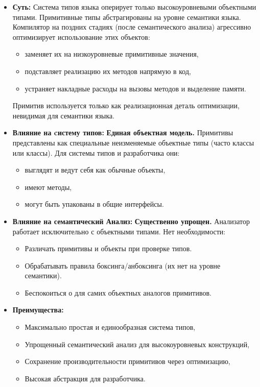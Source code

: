 \begin{itemize}[label={--}, leftmargin=*]
    \item \textbf{Суть:} Система типов языка оперирует только высокоуровневыми объектными типами. Примитивные типы абстрагированы на уровне семантики языка. Компилятор на поздних стадиях (после семантического анализа) агрессивно оптимизирует использование этих объектов:
    \begin{itemize}[label={--}]
        \item заменяет их на низкоуровневые примитивные значения,
        \item подставляет реализацию их методов напрямую в код,
        \item устраняет накладные расходы на вызовы методов и выделение памяти.
    \end{itemize}
    Примитив используется только как реализационная деталь оптимизации, невидимая для семантики языка.

    \item \textbf{Влияние на cистему типов:} \textbf{Единая объектная модель.} Примитивы представлены как специальные неизменяемые объектные типы (часто  классы или  классы). Для системы типов и разработчика они:
    \begin{itemize}[label={--}]
        \item выглядят и ведут себя как обычные объекты,
        \item имеют методы,
        \item могут быть упакованы в общие интерфейсы.
    \end{itemize}

    \item \textbf{Влияние на семантический Анализ:} \textbf{Существенно упрощен.} Анализатор работает исключительно с объектными типами. Нет необходимости:
    \begin{itemize}[label={--}]
        \item Различать примитивы и объекты при проверке типов.
        \item Обрабатывать правила боксинга/анбоксинга (их нет на уровне семантики).
        \item Беспокоиться о  для самих объектных аналогов примитивов.
    \end{itemize}

    \item \textbf{Преимущества:}
    \begin{itemize}[label={--}]
        \item Максимально простая и единообразная система типов,
        \item Упрощенный семантический анализ для высокоуровневых конструкций,
        \item Сохранение производительности примитивов через оптимизацию,
        \item Высокая абстракция для разработчика.
    \end{itemize}


\end{itemize}
